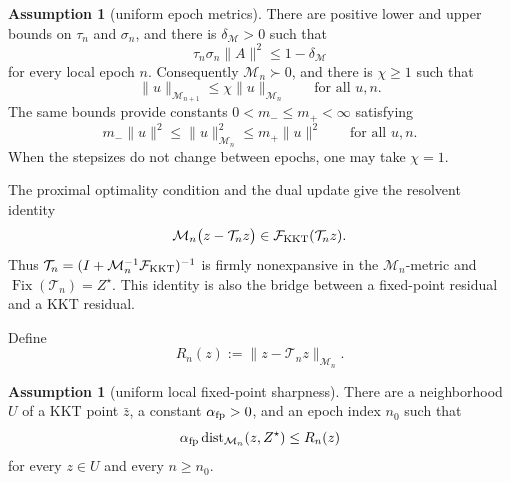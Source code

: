 \documentclass[letterpaper]{article} %
\theoremstyle{definition}
\newtheorem{assumption}[theorem]{Assumption}
\theoremstyle{remark}
\begin{document}
\begin{assumption}[uniform epoch metrics]
\label{ass:uniform-metrics}
There are positive lower and upper bounds on $\tau_n$ and $\sigma_n$, and
there is $\delta_{\mathcal M}>0$ such that
\[
    \tau_n\sigma_n\|A\|^2
    \le
    1-\delta_{\mathcal M}
\]
for every local epoch $n$.  Consequently $\mathcal M_n\succ0$, and there is
$\chi\ge1$ such that
\begin{equation}
\label{eq:metric-equivalence}
    \|u\|_{\mathcal M_{n+1}}
    \le
    \chi\|u\|_{\mathcal M_n}
    \qquad\text{for all }u,n.
\end{equation}
The same bounds provide constants $0<m_-\le m_+<\infty$ satisfying
\begin{equation}
\label{eq:uniform-metric-bounds}
    m_-\|u\|^2
    \le
    \|u\|_{\mathcal M_n}^2
    \le
    m_+\|u\|^2
    \qquad\text{for all }u,n.
\end{equation}
When the stepsizes do not change between epochs, one may take $\chi=1$.
\end{assumption}

The proximal optimality condition and the dual update give the resolvent
identity
\begin{equation}
\label{eq:pdhg-residual-kkt}
    \mathcal M_n\bigl(z-\mathcal T_nz\bigr)
    \in
    \mathcal F_{\rm KKT}(\mathcal T_nz).
\end{equation}
Thus $\mathcal T_n=(I+\mathcal M_n^{-1}\mathcal F_{\rm KKT})^{-1}$ is firmly
nonexpansive in the $\mathcal M_n$-metric and
$\operatorname{Fix}(\mathcal T_n)=Z^\star$.  This identity is also the bridge
between a fixed-point residual and a KKT residual.

Define
\begin{equation}
\label{eq:fp-residual}
    R_n(z)
    :=
    \|z-\mathcal T_nz\|_{\mathcal M_n}.
\end{equation}

\begin{assumption}[uniform local fixed-point sharpness]
\label{ass:fp-sharpness}
There are a neighborhood $U$ of a KKT point $\bar z$, a constant
$\alpha_{\rm fp}>0$, and an epoch index $n_0$ such that
\begin{equation}
\label{eq:fp-sharpness}
    \alpha_{\rm fp}
    \operatorname{dist}_{\mathcal M_n}(z,Z^\star)
    \le
    R_n(z)
\end{equation}
for every $z\in U$ and every $n\ge n_0$.
\end{assumption}
\end{document}
